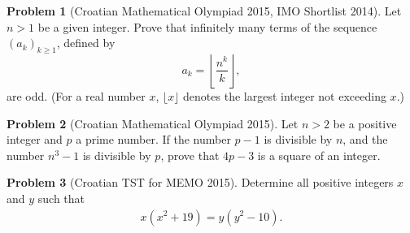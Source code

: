 \documentclass[]{article}
\theoremstyle{definition}
\newtheorem{problem}{Problem}
\begin{document}
\begin{problem}[Croatian Mathematical Olympiad 2015, IMO Shortlist 2014]
	Let $n > 1$ be a given integer. Prove that infinitely many terms of the sequence $(a_k )_{k\ge 1}$, defined by \[a_k=\left\lfloor\frac{n^k}{k}\right\rfloor,\] are odd. (For a real number $x$, $\lfloor x\rfloor$ denotes the largest integer not exceeding $x$.)
\end{problem}



\begin{problem}[Croatian Mathematical Olympiad 2015]
	Let $n > 2$ be a positive integer and $p$ a prime number. If the number $p - 1$ is divisible by $n$, and the number $n^3 - 1$ is divisible by $p$, prove that $4p - 3$ is a square of an integer.
\end{problem}


\begin{problem}[Croatian TST for MEMO 2015]
	Determine all positive integers $x$ and $y$ such that
		\begin{align*}
			x(x^2 + 19) = y(y^2 - 10).
		\end{align*}
\end{problem}
\end{document}
